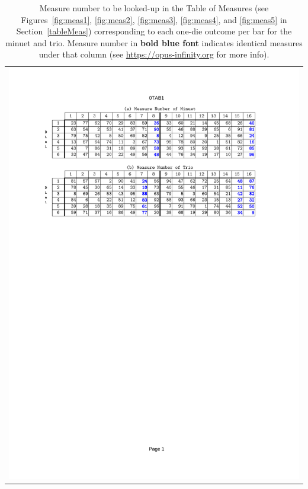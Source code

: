 \documentclass[a4paper,x11names,svgnames,10pt]{article}
\begin{document}
\begin{table}[H]
	\centering
	\begin{tabular}{c}
		\centering
		\includegraphics[clip=true,trim=0.90in 7.45in 1.25in 1.00in,scale=0.90]{012TAB}
	\end{tabular}
	\caption{Measure number to be looked-up in the Table of Measures (see Figures~\ref{fig:meas1}, \ref{fig:meas2}, \ref{fig:meas3}, \ref{fig:meas4}, and \ref{fig:meas5} in Section~\ref{tableMeas}) corresponding to each one-die outcome per bar for the minuet and trio. Measure number in {\bf\color{blue}bold blue font} indicates identical measures under that column (see  \href{https://opus-infinity.org/Kirnberger/Menuet\%20Trio/tables/Piano/}{https://opus-infinity.org} for more info).}
	\label{fig:0tab1}
\end{table}
\end{document}
